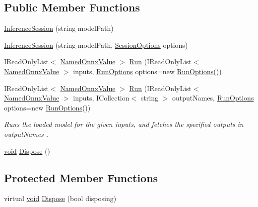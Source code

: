 \subsection*{Public Member Functions}
\begin{DoxyCompactItemize}
\item 
\mbox{\hyperlink{classMicrosoft_1_1ML_1_1OnnxRuntime_1_1InferenceSession_ad3981d9f3b4323653e5718a26af2a8c8}{Inference\+Session}} (string model\+Path)
\item 
\mbox{\hyperlink{classMicrosoft_1_1ML_1_1OnnxRuntime_1_1InferenceSession_a83d9c88f3b76f5b5011b830faab20c83}{Inference\+Session}} (string model\+Path, \mbox{\hyperlink{classMicrosoft_1_1ML_1_1OnnxRuntime_1_1SessionOptions}{Session\+Options}} options)
\item 
I\+Read\+Only\+List$<$ \mbox{\hyperlink{classMicrosoft_1_1ML_1_1OnnxRuntime_1_1NamedOnnxValue}{Named\+Onnx\+Value}} $>$ \mbox{\hyperlink{classMicrosoft_1_1ML_1_1OnnxRuntime_1_1InferenceSession_a29f708b67f43e80b2c3d11976ed91924}{Run}} (I\+Read\+Only\+List$<$ \mbox{\hyperlink{classMicrosoft_1_1ML_1_1OnnxRuntime_1_1NamedOnnxValue}{Named\+Onnx\+Value}} $>$ inputs, \mbox{\hyperlink{structMicrosoft_1_1ML_1_1OnnxRuntime_1_1RunOptions}{Run\+Options}} options=new \mbox{\hyperlink{structMicrosoft_1_1ML_1_1OnnxRuntime_1_1RunOptions}{Run\+Options}}())
\item 
I\+Read\+Only\+List$<$ \mbox{\hyperlink{classMicrosoft_1_1ML_1_1OnnxRuntime_1_1NamedOnnxValue}{Named\+Onnx\+Value}} $>$ \mbox{\hyperlink{classMicrosoft_1_1ML_1_1OnnxRuntime_1_1InferenceSession_a056db8b6717c41e7fa63fe1e5823ac96}{Run}} (I\+Read\+Only\+List$<$ \mbox{\hyperlink{classMicrosoft_1_1ML_1_1OnnxRuntime_1_1NamedOnnxValue}{Named\+Onnx\+Value}} $>$ inputs, I\+Collection$<$ string $>$ output\+Names, \mbox{\hyperlink{structMicrosoft_1_1ML_1_1OnnxRuntime_1_1RunOptions}{Run\+Options}} options=new \mbox{\hyperlink{structMicrosoft_1_1ML_1_1OnnxRuntime_1_1RunOptions}{Run\+Options}}())
\begin{DoxyCompactList}\small\item\em Runs the loaded model for the given inputs, and fetches the specified outputs in {\itshape output\+Names} . \end{DoxyCompactList}\item 
\mbox{\hyperlink{mlasi_8h_a88f941d423cb2a819b70a1358982b1a6}{void}} \mbox{\hyperlink{classMicrosoft_1_1ML_1_1OnnxRuntime_1_1InferenceSession_a2eb590b9d54dea1e8976e19bb844a7fe}{Dispose}} ()
\end{DoxyCompactItemize}
\subsection*{Protected Member Functions}
\begin{DoxyCompactItemize}
\item 
virtual \mbox{\hyperlink{mlasi_8h_a88f941d423cb2a819b70a1358982b1a6}{void}} \mbox{\hyperlink{classMicrosoft_1_1ML_1_1OnnxRuntime_1_1InferenceSession_a4533e6bf48e8f4e3e219521d5bf7ed2f}{Dispose}} (bool disposing)
\end{DoxyCompactItemize}

